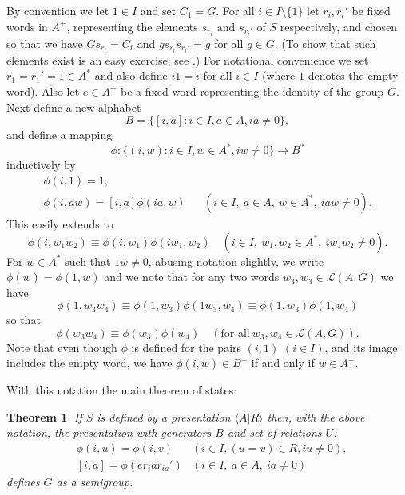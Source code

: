 \documentclass[11pt]{amsart}
\newtheorem{thm}{Theorem}
\theoremstyle{plain}
\begin{document}
By convention we let $1 \in I$ and set $C_1 = G$. For all $i \in I \setminus \{ 1 \}$ let $r_i, r_i'$ be fixed words in $A^+$, representing the elements $s_{r_i}$ and $s_{r_i'}$ of $S$ respectively, and chosen so that we have $G s_{r_i}  = C_i$ and $g s_{r_i} s_{r_i'} = g$ for all $g \in G$. (To show that such elements exist is an easy exercise; see \cite[Proposition~2.4]{Ruskuc2}.) For notational convenience we set $r_1 = r_1' = 1 \in A^*$ and also define $i 1 = i$ for all $i \in I$ (where $1$ denotes the empty word). Also let $e \in A^+$ be a fixed word representing the identity of the group $G$. Next define a new alphabet
\[
B = \{ [i,a]: i \in I, a \in A, ia \neq 0 \},
\]
and define a mapping
\[
\phi: \{(i,w): i \in I, w \in A^*, iw \neq 0    \} \rightarrow B^*
\]
inductively by
\[
\begin{array}{lll}
\phi(i,1) = 1, & &  \\
\phi(i, aw) = [i,a] \phi(ia, w) & & (i \in I, \ a \in A, \ w \in A^*, \ iaw \neq 0).
\end{array}
\]
This easily extends to
\begin{equation}
\phi(i,w_1 w_2) \equiv \phi(i, w_1)\phi(i w_1, w_2) \quad (i \in I, \ w_1, w_2 \in A^*, \ iw_1 w_2 \neq 0). \label{identity}
\end{equation}
For $w \in A^*$ such that $1w \neq 0$, abusing notation slightly, we write $\phi(w) = \phi(1,w)$ and we note that for any two words $w_3, w_3 \in {\mathcal{L}({A,G})}$ we have
\[
\phi(1,w_3w_4) \equiv \phi(1,w_3) \phi(1w_3, w_4) \equiv \phi(1,w_3) \phi(1,w_4)
\]
so that
\begin{equation} \label{homonG}
\phi(w_3 w_4) \equiv \phi(w_3) \phi(w_4) \quad (\mbox{for all} \ w_3, w_4 \in {\mathcal{L}({A,G})}).
\end{equation}
Note that even though $\phi$ is defined for the pairs $(i,1)$ $(i \in I)$, and its image includes the empty word, we have $\phi(i,w) \in B^+$ if and only if $w \in A^+$.  

With this notation the main theorem of \cite{Ruskuc2} states:
\begin{thm}\cite[Theorem~2.9]{Ruskuc2} \label{TPres}
If $S$ is defined by a presentation ${\langle} A | R {\rangle}$ then, with the above notation, the presentation with generators $B$ and set of relations $U$:
\[
\begin{array}{lll}
 & \phi(i,u) = \phi(i,v) & (i \in I, (u=v) \in R, iu \neq 0), \\
	& [i,a] = \phi(er_iar_{ia}')  & (i \in I, \ a \in A, \ ia \neq 0)
\end{array}
\]
defines $G$ as a semigroup.
\end{thm}
\end{document}
